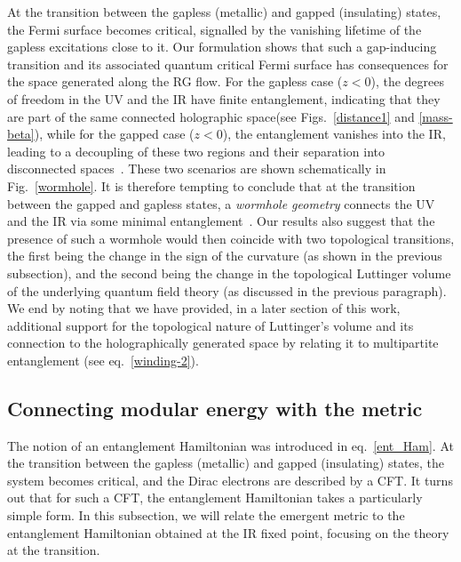 At the transition between the gapless (metallic) and gapped (insulating) states, the Fermi surface becomes critical, signalled by the vanishing lifetime of the gapless excitations close to it. Our formulation shows that such a gap-inducing transition and its associated quantum critical Fermi surface has consequences for the space generated along the RG flow. For the gapless case (\(z < 0\)), the degrees of freedom in the UV and the IR have finite entanglement, indicating that they are part of the same connected holographic space(see Figs.~\ref{distance1} and \ref{mass-beta}), while for the gapped case (\(z < 0\)), the entanglement vanishes into the IR, leading to a decoupling of these two regions and their separation into disconnected spaces~\cite{van2010building}. These two scenarios are shown schematically in Fig.~\ref{wormhole}. It is therefore tempting to conclude that at the transition between the gapped and gapless states, a {\it wormhole geometry} connects the UV and the IR via some minimal entanglement~\cite{van2010building,cao_2017}. Our results also suggest that the presence of such a wormhole would then coincide with two topological transitions, the first being the change in the sign of the curvature (as shown in the previous subsection), and the second being the change in the topological Luttinger volume of the underlying quantum field theory (as discussed in the previous paragraph). We end by noting that we have provided, in a later section of this work, additional support for the topological nature of Luttinger's volume and its connection to the holographically generated space by relating it to multipartite entanglement (see eq.~\eqref{winding-2}).

\subsection{Connecting modular energy with the metric}
The notion of an entanglement Hamiltonian was introduced in eq.~\eqref{ent_Ham}. At the transition between the gapless (metallic) and gapped (insulating) states, the system becomes critical, and the Dirac electrons are described by a CFT. It turns out that for such a CFT, the entanglement Hamiltonian takes a particularly simple form. In this subsection, we will relate the emergent metric to the entanglement Hamiltonian obtained at the IR fixed point, focusing on the theory at the transition.

